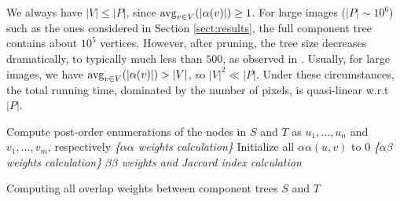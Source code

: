 We always have $|V|\le|P|$, since $\mathrm{avg}_{v\in V}(|\alpha(v)|) \ge 1$.
For large images ($|P| \sim 10^6$) such as the ones considered in Section
\ref{sect:results}, the full component tree contains about $10^5$ vertices.  
However, after pruning, the tree size decreases dramatically, to typically much
less than $500$, as observed in \cite{Xiao:2011}.  
Usually, for large images, we have $\mathrm{avg}_{v\in V}(|\alpha(v)|) > |V|$, so $|V|^2
\ll |P|$. Under these circumstances, the total running time, dominated by the
number of pixels, is quasi-linear w.r.t $|P|$.

\begin{algorithm}[H]
\SetAlgoLined
{}
Compute post-order enumerations of the nodes in $S$ and $T$ as $u_1,\ldots,u_n$ and $v_1, \ldots, v_m$, respectively\;
\emph{\{$\alpha\alpha$ weights calculation\}}\;
Initialize all $\alpha\alpha(u,v)$ to 0\;
\emph{\{$\alpha\beta$ weights calculation\}}\;
\emph{$\beta\beta$ weights and Jaccard index calculation}\;
\caption{Computing all overlap weights between component trees $S$ and $T$}
\label{alg:cptree-weights}
\end{algorithm}
